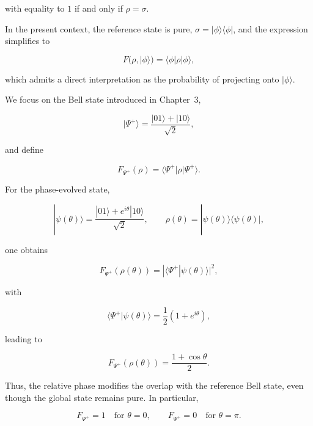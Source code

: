with equality to \(1\) if and only if \( \rho = \sigma \).

\medskip

In the present context, the reference state is pure, \( \sigma = |\phi\rangle\langle\phi| \), and the expression simplifies to

\begin{equation}
F(\rho,|\phi\rangle)
=
\langle \phi | \rho | \phi \rangle,
\label{eq:fidelity_pure_reference}
\end{equation}

which admits a direct interpretation as the probability of projecting onto \( |\phi\rangle \).

\medskip

We focus on the Bell state introduced in Chapter~3,

\[
|\Psi^+\rangle
=
\frac{|01\rangle + |10\rangle}{\sqrt{2}},
\]

and define

\begin{equation}
F_{\Psi^+}(\rho)
=
\langle \Psi^+ | \rho | \Psi^+ \rangle.
\label{eq:fidelity_psi_plus_definition}
\end{equation}

\medskip

For the phase-evolved state,

\[
|\psi(\theta)\rangle
=
\frac{|01\rangle + e^{i\theta}|10\rangle}{\sqrt{2}},
\qquad
\rho(\theta)
=
|\psi(\theta)\rangle\langle\psi(\theta)|,
\]

one obtains

\[
F_{\Psi^+}(\rho(\theta))
=
|\langle \Psi^+|\psi(\theta)\rangle|^2,
\]

with

\[
\langle \Psi^+|\psi(\theta)\rangle
=
\frac{1}{2}
\left(
1+e^{i\theta}
\right),
\]

leading to

\begin{equation}
F_{\Psi^+}(\rho(\theta))
=
\frac{1+\cos\theta}{2}.
\label{eq:phase_state_fidelity_psi_plus}
\end{equation}

\medskip

Thus, the relative phase modifies the overlap with the reference Bell state, even though the global state remains pure. In particular,

\[
F_{\Psi^+}=1
\quad
\text{for }
\theta=0,
\qquad
F_{\Psi^+}=0
\quad
\text{for }
\theta=\pi.
\]

\medskip

